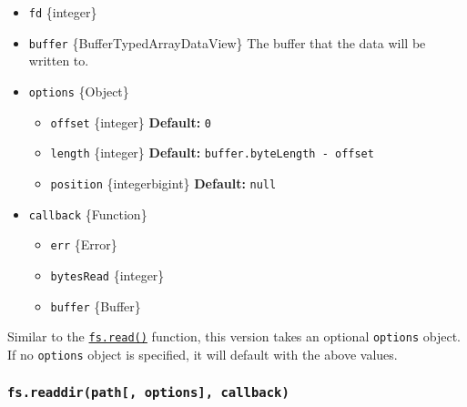 \begin{itemize}
\tightlist
\item
  \texttt{fd} \{integer\}
\item
  \texttt{buffer} \{Buffer\textbar TypedArray\textbar DataView\} The
  buffer that the data will be written to.
\item
  \texttt{options} \{Object\}

  \begin{itemize}
  \tightlist
  \item
    \texttt{offset} \{integer\} \textbf{Default:} \texttt{0}
  \item
    \texttt{length} \{integer\} \textbf{Default:}
    \texttt{buffer.byteLength\ -\ offset}
  \item
    \texttt{position} \{integer\textbar bigint\} \textbf{Default:}
    \texttt{null}
  \end{itemize}
\item
  \texttt{callback} \{Function\}

  \begin{itemize}
  \tightlist
  \item
    \texttt{err} \{Error\}
  \item
    \texttt{bytesRead} \{integer\}
  \item
    \texttt{buffer} \{Buffer\}
  \end{itemize}
\end{itemize}

Similar to the
\hyperref[fsreadfd-buffer-offset-length-position-callback]{\texttt{fs.read()}}
function, this version takes an optional \texttt{options} object. If no
\texttt{options} object is specified, it will default with the above
values.

\subsubsection{\texorpdfstring{\texttt{fs.readdir(path{[},\ options{]},\ callback)}}{fs.readdir(path{[}, options{]}, callback)}}\label{fs.readdirpath-options-callback}

